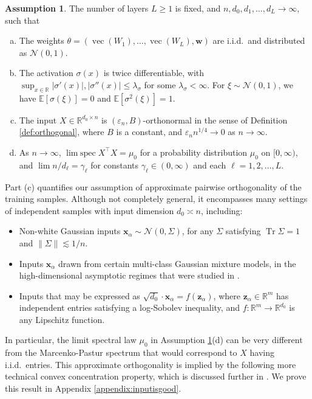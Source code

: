 \documentclass{article}
\theoremstyle{definition}
\newtheorem{assumption}[theorem]{Assumption}
\newcommand{\R}{\mathbb{R}}
\newcommand{\N}{\mathcal{N}}
\newcommand{\E}{\mathbb{E}}
\newcommand{\Tr}{\operatorname{Tr}}
\newcommand{\x}{\mathbf{x}}
\newcommand{\z}{\mathbf{z}}
\newcommand{\w}{\mathbf{w}}
\renewcommand{\a}{\alpha}
\newcommand{\eps}{\varepsilon}
\newcommand{\1}{\mathbf{1}}
\renewcommand{\vec}{\operatorname{vec}}
\newcommand{\limspec}{\operatorname{lim\;spec}}
\begin{document}
\begin{assumption}\label{assump:asymptotics}
The number of layers $L \geq 1$ is fixed,
and $n,d_0,d_1,\ldots,d_L \to \infty$, such that
\begin{enumerate}[(a)]
\item The weights $\theta=(\vec(W_1),\ldots,\vec(W_L),\w)$ are i.i.d.\ and distributed
as $\N(0,1)$.
\item The activation $\sigma(x)$ is twice differentiable, with $\sup_{x \in \R}
|\sigma'(x)|,|\sigma''(x)| \leq \lambda_\sigma$ for some
$\lambda_\sigma<\infty$. For $\xi \sim \N(0,1)$, we have
$\E[\sigma(\xi)]=0$ and $\E[\sigma^2(\xi)]=1$.
\item The input $X \in \R^{d_0 \times n}$
is $(\eps_n,B)$-orthonormal in the sense of Definition
\ref{def:orthogonal}, where $B$ is a constant, and
$\eps_n n^{1/4} \to 0$ as $n \to \infty$.
\item As $n \to \infty$, $\limspec X^\top X=\mu_0$
for a probability distribution $\mu_0$ on $[0,\infty)$,
and $\lim n/d_\ell=\gamma_\ell$ for constants $\gamma_\ell \in (0,\infty)$
and each $\ell=1,2,\ldots,L$.
\end{enumerate}
\end{assumption}

Part (c) quantifies our assumption of approximate pairwise orthogonality of
the training samples. Although not completely general, it encompasses many
settings of independent samples with input dimension $d_0 \asymp n$,
including:
\begin{itemize}
\item Non-white Gaussian inputs $\x_\a \sim \N(0,\Sigma)$,
for any $\Sigma$ satisfying $\Tr \Sigma=1$ and $\|\Sigma\| \lesssim 1/n$.
\item Inputs $\x_\a$ drawn from certain multi-class Gaussian mixture models,
in the high-dimensional asymptotic regimes that were studied in \cite{couillet2016kernel,louart2018random,liao2018spectrum,liao2018dynamics,liao2019inner}.
\item Inputs that may be expressed as
$\sqrt{d_0} \cdot \x_\a=f(\z_\a)$, where $\z_\a \in \R^m$ has independent
entries satisfying a log-Sobolev inequality, and $f:\R^m \to \R^{d_0}$ is any
Lipschitz function.
\end{itemize}
In particular, the limit spectral law $\mu_0$ in Assumption
\ref{assump:asymptotics}(d) can be very different
from the Marcenko-Pastur spectrum that would correspond to $X$ having
i.i.d.\ entries. This approximate orthogonality is implied by the following more
technical convex concentration property, which is discussed further
in \cite{vu2015random,adamczak2015note}. We prove this result in Appendix
\ref{appendix:inputisgood}.
\end{document}
